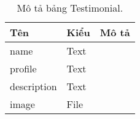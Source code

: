 \begin{table}[p]
\begin{center}
\begin{tabular}{ |l|l|l| } 
	\hline
	Tên & Kiểu & Mô tả \\
	\hline
	name & Text & \dotfill \\
profile & Text & \dotfill \\
description & Text & \dotfill \\
image & File & \dotfill \\ 
	\hline
\end{tabular}
	\caption{Mô tả bảng Testimonial.}
	\label{table:Testimonial}
\end{center}
\end{table}
